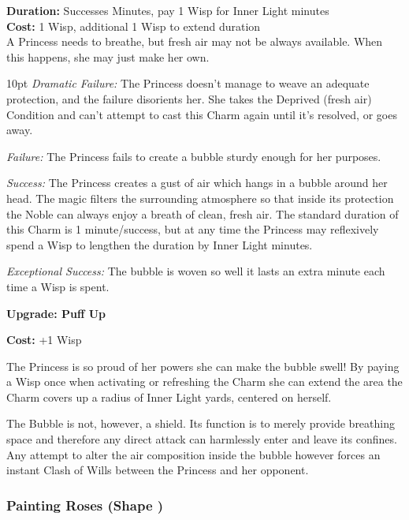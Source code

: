 \noindent \textbf{Duration:} Successes Minutes, pay 1 Wisp for Inner Light minutes\\

\noindent \textbf{Cost:} 1 Wisp, additional 1 Wisp to extend duration\\

\noindent A Princess needs to breathe, but fresh air may not be always available. When this happens, she may just make her own.

\begin{myindentpar}{10pt}    \emph{Dramatic Failure:} The Princess doesn't manage to weave an adequate protection, and the failure disorients her. She takes the Deprived (fresh air) Condition and can't attempt to cast this Charm again until it's resolved, or goes away.

\emph{Failure:} The Princess fails to create a bubble sturdy enough for her purposes.

\emph{Success:} The Princess creates a gust of air which hangs in a bubble around her head. The magic filters the surrounding atmosphere so that inside its protection the Noble can always enjoy a breath of clean, fresh air. The standard duration of this Charm is 1 minute/success, but at any time the Princess may reflexively spend a Wisp to lengthen the duration by Inner Light minutes.

\emph{Exceptional Success:} The bubble is woven so well it lasts an extra minute each time a Wisp is spent.

\textbf{Upgrade: Puff Up}

\noindent \textbf{Cost:} +1 Wisp

The Princess is so proud of her powers she can make the bubble swell! By paying a Wisp once when activating or refreshing the Charm she can extend the area the Charm covers up a radius of Inner Light yards, centered on herself.

The Bubble is not, however, a shield. Its function is to merely provide breathing space and therefore any direct attack can harmlessly enter and leave its confines. Any attempt to alter the air composition inside the bubble however forces an instant Clash of Wills between the Princess and her opponent.\end{myindentpar}


\subsubsection*{Painting Roses (Shape \textbullet)}

